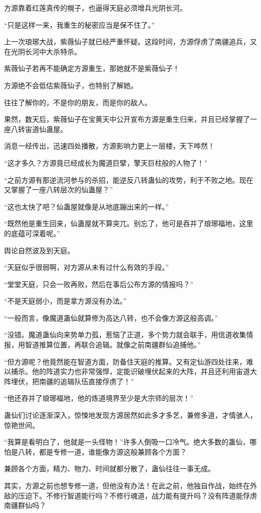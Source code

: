 \begin{this_body}
方源靠着红莲真传的幌子，也逼得天庭必须增兵光阴长河。

“只是这样一来，我重生的秘密应当是保不住了。”

上一次琅琊大战，紫薇仙子就已经严重怀疑。这段时间，方源俘虏了南疆追兵，又在光阴长河中大杀特杀。

紫薇仙子若再不能确定方源重生，那她就不是紫薇仙子！

方源绝不会低估紫薇仙子，也特别了解她。

往往了解你的，不是你的朋友，而是你的敌人。

果然，数天后，紫薇仙子在宝黄天中公开宣布方源是重生归来，并且已经掌握了一座八转宙道仙蛊屋。

消息一经传出，迅速四处播散，方源影响力更上一层楼，天下哗然！

“这才多久？方源竟已经成长为魔道巨擘，擎天巨柱般的人物了！”

“之前方源有那逆流河参与的杀招，能逆反八转蛊仙的攻势，利于不败之地。现在又掌握了一座八转层次的仙蛊屋？”

“这也太快了吧？仙蛊屋就像是从地底蹦出来的一样。”

“既然他是重生回来，仙蛊屋就不算突兀。别忘了，他可是吞并了琅琊福地，这里的底蕴可深着呢。”

舆论自然波及到天庭。

“天庭似乎很弱啊，对方源从未有过什么有效的手段。”

“堂堂天庭，只会一败再败，然后在事后公布方源的情报吗？”

“不是天庭弱小，而是拿方源没有办法。”

“一般而言，像魔道蛊仙就算修为高达八转，也不会像方源这般高调。”

“没错。魔道蛊仙向来势单力孤，惹恼了正道，多个势力就会联手，用信道收集情报，用智道推算位置，再联合追辑。就像之前南疆群仙追捕他。”

“但方源呢？他竟然能在智道方面，防备住天庭的推算。又有定仙游四处往来，难以捕杀。他的阵道实力也非常强悍，定能识破埋伏起来的大阵，并且还利用宙道大阵埋伏，把南疆的追辑队伍直接俘虏了！”

“他还吞并了琅琊福地，他的炼道境界至少是大宗师的层次！”

蛊仙们讨论逐渐深入，惊悚地发现方源居然如此多才多艺，兼修多道，才情骇人，惊艳世间。

“我算是看明白了，他就是一头怪物！”许多人倒吸一口冷气。绝大多数的蛊仙，哪怕是八转，都是专修一道，谁能像方源这般兼顾各个方面？

兼顾各个方面，精力、物力、时间就都分散了，蛊仙往往一事无成。

其实，方源之前也想专修一道，但他没有办法！在此之前，他独自作战，始终在外敌的压迫下。不修行智道能行吗？不修行魂道，战力能有提升吗？没有阵道能俘虏南疆群仙吗？


\end{this_body}
